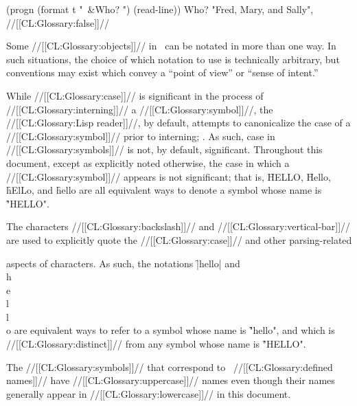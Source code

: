 \code
 (progn (format t "~&Who? ") (read-line))
\OUT Who? 
\EV "Fred, Mary, and Sally", //[[CL:Glossary:false]]//
\endcode

\endlist

\endsubsubsection%


Some //[[CL:Glossary:objects]]// in \clisp\ can be notated in more than one way.
In such situations, the choice of which notation to use is technically arbitrary,
but conventions may exist which convey a ``point of view'' or ``sense of intent.''



While //[[CL:Glossary:case]]// is significant in the process of //[[CL:Glossary:interning]]// a //[[CL:Glossary:symbol]]//,
the //[[CL:Glossary:Lisp reader]]//, by default, attempts to canonicalize the case of a
//[[CL:Glossary:symbol]]// prior to interning; \seesection\ReadtableCaseReadEffect.
As such, case in //[[CL:Glossary:symbols]]// is not, by default, significant.
Throughout this document, except as explicitly noted otherwise,
the case in which a //[[CL:Glossary:symbol]]// appears is not significant; 
that is, \f{HELLO}, \f{Hello}, \f{hElLo}, and \f{hello} are
all equivalent ways to denote a symbol whose name is \f{"HELLO"}.

The characters //[[CL:Glossary:backslash]]// and //[[CL:Glossary:vertical-bar]]// are used to explicitly
quote the //[[CL:Glossary:case]]// and other parsing-related 


aspects
of characters.  As such,
the notations \f{|hello|} and \f{\\h\\e\\l\\l\\o} are equivalent ways
to refer to a symbol whose name is \f{"hello"}, and which is //[[CL:Glossary:distinct]]// from
any symbol whose name is \f{"HELLO"}.

The //[[CL:Glossary:symbols]]// that correspond to \clisp\ //[[CL:Glossary:defined names]]//
have //[[CL:Glossary:uppercase]]// names even though their names generally appear
in //[[CL:Glossary:lowercase]]// in this document.

\endsubsubsubsection%



